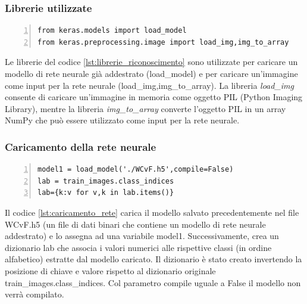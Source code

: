 \documentclass[a4paper,final,12pt]{report}
\begin{document}
\subsubsection{Librerie utilizzate}
\begin{lstlisting}[caption={Librerie per il riconoscimetno dell'immagine.}, label={lst:librerie_riconoscimento}, breaklines, escapechar=`\%, frame=lines, basicstyle=\small\ttfamily, keepspaces=true, numbers=left]
from keras.models import load_model
from keras.preprocessing.image import load_img,img_to_array
\end{lstlisting}
Le librerie del codice \ref{lst:librerie_riconoscimento} sono utilizzate per caricare un modello di rete neurale già addestrato (load\_model) e per caricare un'immagine come input per la rete neurale (load\_img,img\_to\_array). La libreria \textit{load\_img} consente di caricare un'immagine in memoria come oggetto PIL (Python Imaging Library), mentre la libreria \textit{img\_to\_array} converte l'oggetto PIL in un array NumPy che può essere utilizzato come input per la rete neurale.

\subsubsection{Caricamento della rete neurale}
\begin{lstlisting}[caption={Codice di caricamento della rete neurale.}, label={lst:caricamento_rete}, breaklines, escapechar=`\%, frame=lines, basicstyle=\small\ttfamily, keepspaces=true, numbers=left]
model1 = load_model('./WCvF.h5',compile=False)
lab = train_images.class_indices
lab={k:v for v,k in lab.items()}
\end{lstlisting}
Il codice \ref{lst:caricamento_rete} carica il modello salvato precedentemente nel file WCvF.h5 (un file di dati binari che contiene un modello di rete neurale addestrato) e lo assegna ad una variabile model1. Successivamente, crea un dizionario lab che associa i valori numerici alle rispettive classi (in ordine alfabetico) estratte dal modello caricato. Il dizionario è stato creato invertendo la posizione di chiave e valore rispetto al dizionario originale train\_images.class\_indices. Col parametro compile uguale a False il modello non verrà compilato.
\end{document}
